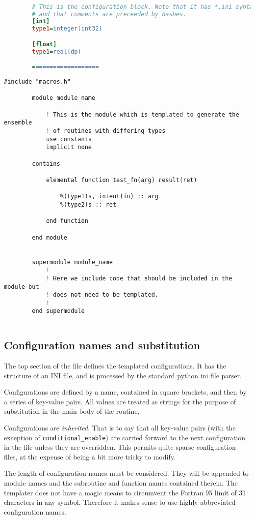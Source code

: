\documentclass[a4paper,notitlepage]{scrreprt}
\let\code\lstinline
\begin{document}
	\begin{lstlisting}[gobble=4,language=ini]

		# This is the configuration block. Note that it has *.ini syntax,
		# and that comments are preceeded by hashes.
		[int]
		type1=integer(int32)

		[float]
		type1=real(dp)

		===================
	\end{lstlisting}
	\begin{lstlisting}[gobble=4]
		#include "macros.h"

		module module_name

			! This is the module which is templated to generate the ensemble
			! of routines with differing types
			use constants
			implicit none

		contains

			elemental function test_fn(arg) result(ret)

				%(type1)s, intent(in) :: arg
				%(type2)s :: ret

			end function

		end module


		supermodule module_name
			!
			! Here we include code that should be included in the module but
			! does not need to be templated.
			!
		end supermodule


	\end{lstlisting}

\subsection{Configuration names and substitution}
	The top section of the file defines the templated configurations. It has
	the structure of an INI file, and is processed by the standard python ini
	file parser.

	Configurations are defined by a name, contained in square brackets, and
	then by a series of key-value pairs. All values are treated as strings for
	the purpose of substitution in the main body of the routine.

	Configurations are \emph{inherited}. That is to say that all key-value
	pairs (with the exception of \code{conditional_enable}) are carried
	forward to the next configuration in the file unless they are overridden.
	This permits quite sparse configuration files, at the expense of being
	a bit more tricky to modify.

	The length of configuration names must be considered. They will be appended
	to module names and the subroutine and function names contained therein.
	The templater does not have a magic means to circumvent the Fortran 95
	limit of 31 characters in any symbol. Therefore it makes sense to use
	highly abbreviated configuration names.
\end{document}

